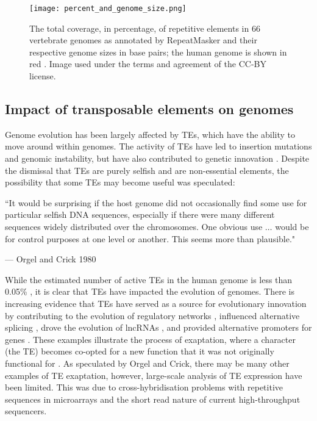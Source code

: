 \begin{figure}[!ht]
   \centering
   \texttt{[image: percent\_and\_genome\_size.png]}
   \caption[Coverage of repetitive elements in vertebrate genomes]{The total coverage, in percentage, of repetitive elements in 66 vertebrate genomes as annotated by RepeatMasker and their respective genome sizes in base pairs; the human genome is shown in red \citep{tang2014repcoverage}. Image used under the terms and agreement of the CC-BY license.}
   \label{fig:repeat_coverage_vertebrate_genome}
\end{figure}

\subsection{Impact of transposable elements on genomes}

Genome evolution has been largely affected by TEs, which have the ability to move around within genomes. The activity of TEs have led to insertion mutations and genomic instability, but have also contributed to genetic innovation \citep{pmid19763152}. Despite the dismissal that TEs are purely selfish and are non-essential elements, the possibility that some TEs may become useful was speculated:

\epigraph{``It would be surprising if the host genome did not occasionally find some use for particular selfish DNA sequences, especially if there were many different sequences widely distributed over the chromosomes. One obvious use $\ldots$ would be for control purposes at one level or another. This seems more than plausible."}{--- \textup{Orgel and Crick 1980}}

While the estimated number of active TEs in the human genome is less than 0.05\% \citep{pmid17331616}, it is clear that TEs have impacted the evolution of genomes. There is increasing evidence that TEs have served as a source for evolutionary innovation by contributing to the evolution of regulatory networks \citep{pmid18368054}, influenced alternative splicing \citep{pmid18818740}, drove the evolution of lncRNAs \citep{pmid23637635}, and provided alternative promoters for genes \citep{pmid19577618}. These examples illustrate the process of exaptation, where a character (the TE) becomes co-opted for a new function that it was not originally functional for \citep{Gould01011982}. As speculated by Orgel and Crick, there may be many other examples of TE exaptation, however, large-scale analysis of TE expression have been limited. This was due to cross-hybridisation problems with repetitive sequences in microarrays and the short read nature of current high-throughput sequencers.

